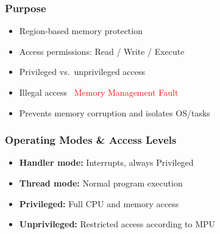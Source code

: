   \begin{minipage}[t]{0.58\linewidth}
    \subsubsection{Purpose}
    \begin{itemize}
      \item Region-based memory protection
      \item Access permissions: Read / Write / Execute
      \item Privileged vs.~unprivileged access
      \item Illegal access \textrightarrow~\textcolor{red}{Memory Management Fault}
      \item Prevents memory corruption and isolates OS/tasks
    \end{itemize}

    \subsubsection{Operating Modes \& Access Levels}
    \begin{itemize}
      \item \textbf{Handler mode:} Interrupts, always Privileged
      \item \textbf{Thread mode:} Normal program execution
      \item \textbf{Privileged:} Full CPU and memory access
      \item \textbf{Unprivileged:} Restricted access according to MPU
    \end{itemize}
  \end{minipage}\hfill
